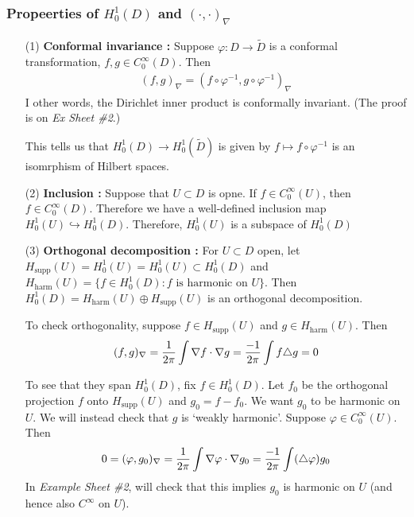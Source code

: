 \documentclass[12pt,a4paper]{article}
\newenvironment{proof}
{\begin{changemargin}{0.5cm}{0.5cm} 
	}%
	{\end{changemargin}
}
\newenvironment{p}
{\begin{proof} 
	}%
	{\end{proof}
}
\begin{document}
\subsubsection*{Propeerties of $H_0^1(D)$ and $(\cdot, \cdot)_{\nabla}$}

\begin{itemize}
\item[(1)] \textbf{Conformal invariance :} Suppose $\varphi : D \rightarrow \tilde{D}$ is a conformal transformation, $f, g\in C_0^{\infty}(D)$. Then
\begin{align*}
(f,g)_{\nabla} = (f\circ \varphi^{-1}, g\circ \varphi^{-1})_{\nabla}
\end{align*}
I other words, the Dirichlet inner product is conformally invariant. (The proof is on \emph{Ex Sheet \#2}.)

\quad This tells us that $H_0^1(D) \rightarrow H_0^1(\tilde{D})$ is given by $f \mapsto f\circ \varphi^{-1}$ is an isomrphism of Hilbert spaces.

\item[(2)] \textbf{Inclusion :} Suppose that $U\subset D$ is opne. If $f\in C_0^{\infty}(U)$, then $f\in C_0^{\infty}(D)$. Therefore we have a well-defined inclusion map $H_0^1(U) \hookrightarrow H_0^1(D)$. Therefore, $H_0^1(U)$ is a subspace of $H_0^1(D)$ 

\item[(3)] \textbf{Orthogonal decomposition :} For $U\subset D$ open, let $H_{\text{supp}}(U) = H_0^1(U) = H_0^1(U) \subset H_0^1(D)$ and $H_{\text{harm}}(U) = \{ f\in H_0^1(D) : f\text{ is harmonic on } U \}$. Then $H_0^1(D) = H_{\text{harm}}(U) \oplus H_{\text{supp}}(U)$ is an orthogonal decomposition.
\begin{p}
\pf To check orthogonality, suppose $f\in H_{\text{supp}}(U)$ and $g\in H_{\text{harm}}(U)$. Then
\begin{align*}
(f,g)_{\nabla} = \frac{1}{ 2\pi } \int \nabla f \cdot \nabla g = \frac{-1}{2\pi} \int f \triangle g =0
\end{align*}

To see that they span $H_0^1(D)$, fix $f\in H_0^1(D)$. Let $f_0$ be the orthogonal projection $f$ onto $H_{\text{supp}}(U)$ and $g_0 = f- f_0$. We want $g_0$ to be harmonic on $U$. We will instead check that $g$ is `weakly harmonic'. Suppose $\varphi \in C_0^{\infty}(U)$. Then 
\begin{align*}
0 =(\varphi, g_0)_{\nabla} = \frac{1}{2\pi} \int \nabla \varphi \cdot \nabla g_0 = \frac{-1}{2\pi} \int (\triangle \varphi) g_0 
\end{align*}
In \emph{Example Sheet \#2}, will check that this implies $g_0$ is harmonic on $U$ (and hence also $C^{\infty}$ on $U$).

\eop
\end{p}
\end{itemize}
\s
\end{document}
